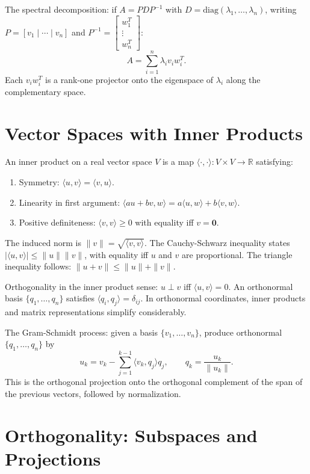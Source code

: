 \documentclass[11pt]{article}
\begin{document}
The spectral decomposition: if $A = PDP^{-1}$ with $D = \text{diag}(\lambda_1, \ldots, \lambda_n)$, writing $P = [v_1 \mid \cdots \mid v_n]$ and $P^{-1} = \begin{bmatrix} w_1^T \\ \vdots \\ w_n^T \end{bmatrix}$:
\[
A = \sum_{i=1}^n \lambda_i v_i w_i^T.
\]
Each $v_i w_i^T$ is a rank-one projector onto the eigenspace of $\lambda_i$ along the complementary space.

\section*{Vector Spaces with Inner Products}

An inner product on a real vector space $V$ is a map $\langle \cdot, \cdot \rangle : V \times V \to \mathbb{R}$ satisfying:
\begin{enumerate}
  \item Symmetry: $\langle u, v \rangle = \langle v, u \rangle$.
  \item Linearity in first argument: $\langle au + bv, w \rangle = a\langle u, w\rangle + b\langle v, w\rangle$.
  \item Positive definiteness: $\langle v, v \rangle \geq 0$ with equality iff $v = \mathbf{0}$.
\end{enumerate}

The induced norm is $\|v\| = \sqrt{\langle v, v \rangle}$. The Cauchy-Schwarz inequality states $|\langle u, v \rangle| \leq \|u\| \|v\|$, with equality iff $u$ and $v$ are proportional. The triangle inequality follows: $\|u + v\| \leq \|u\| + \|v\|$.

Orthogonality in the inner product sense: $u \perp v$ iff $\langle u, v \rangle = 0$. An orthonormal basis $\{q_1, \ldots, q_n\}$ satisfies $\langle q_i, q_j \rangle = \delta_{ij}$. In orthonormal coordinates, inner products and matrix representations simplify considerably.

The Gram-Schmidt process: given a basis $\{v_1, \ldots, v_n\}$, produce orthonormal $\{q_1, \ldots, q_n\}$ by
\[
u_k = v_k - \sum_{j=1}^{k-1} \langle v_k, q_j \rangle q_j, \qquad q_k = \frac{u_k}{\|u_k\|}.
\]
This is the orthogonal projection onto the orthogonal complement of the span of the previous vectors, followed by normalization.

\section*{Orthogonality: Subspaces and Projections}
\end{document}
